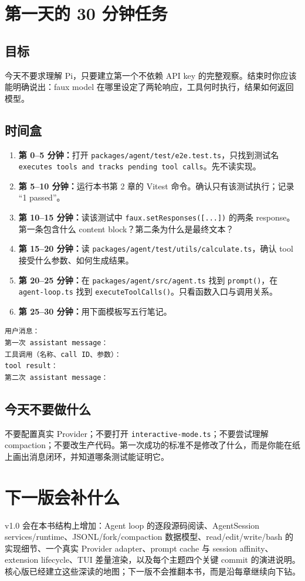 \documentclass[UTF8,openany,11pt]{ctexbook}
\newcommand{\pathref}[1]{\texttt{#1}}
\begin{document}
\chapter{第一天的 30 分钟任务}

\section{目标}
今天不要求理解 Pi，只要建立第一个不依赖 API key 的完整观察。结束时你应该能明确说出：faux model 在哪里设定了两轮响应，工具何时执行，结果如何返回模型。

\section{时间盒}
\begin{enumerate}
\item \textbf{第 0--5 分钟：}打开 \pathref{packages/agent/test/e2e.test.ts}，只找到测试名 \texttt{executes tools and tracks pending tool calls}。先不读实现。
\item \textbf{第 5--10 分钟：}运行本书第 2 章的 Vitest 命令。确认只有该测试执行；记录 ``1 passed''。
\item \textbf{第 10--15 分钟：}读该测试中 \texttt{faux.setResponses([...])} 的两条 response。第一条包含什么 content block？第二条为什么是最终文本？
\item \textbf{第 15--20 分钟：}读 \pathref{packages/agent/test/utils/calculate.ts}，确认 tool 接受什么参数、如何生成结果。
\item \textbf{第 20--25 分钟：}在 \pathref{packages/agent/src/agent.ts} 找到 \texttt{prompt()}，在 \pathref{agent-loop.ts} 找到 \texttt{executeToolCalls()}。只看函数入口与调用关系。
\item \textbf{第 25--30 分钟：}用下面模板写五行笔记。
\end{enumerate}

\begin{Verbatim}[fontsize=\small]
用户消息：
第一次 assistant message：
工具调用（名称、call ID、参数）：
tool result：
第二次 assistant message：
\end{Verbatim}

\section{今天不要做什么}
不要配置真实 Provider；不要打开 \texttt{interactive-mode.ts}；不要尝试理解 compaction；不要改生产代码。第一次成功的标准不是修改了什么，而是你能在纸上画出消息闭环，并知道哪条测试能证明它。

\backmatter
\chapter*{下一版会补什么}
v1.0 会在本书结构上增加：Agent loop 的逐段源码阅读、AgentSession services/runtime、JSONL/fork/compaction 数据模型、read/edit/write/bash 的实现细节、一个真实 Provider adapter、prompt cache 与 session affinity、extension lifecycle、TUI 差量渲染，以及每个主题四个关键 commit 的演进说明。核心版已经建立这些深读的地图；下一版不会推翻本书，而是沿每章继续向下钻。
\end{document}
